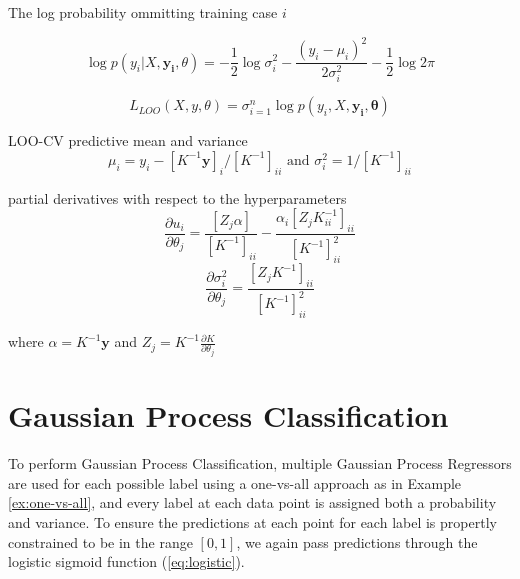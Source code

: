 The log probability ommitting training case $i$

$$\log p(y_i|X, \mathbf{y_i}, \theta) = -\frac{1}{2}\log\sigma^2_i - \frac{(y_i - \mu_i)^2}{2 \sigma^2_i} - \frac{1}{2}\log2\pi$$

$$ L_{LOO}(X, y, \theta) = \sigma^n_{i=1} \log p(y_i, X, \mathbf{y_i}, \mathbf{\theta})$$

LOO-CV predictive mean and variance
$$\mu_i= y_i - [K^{-1}\mathbf{y}]_i / [K^{-1}]_{ii} \text{ and } \sigma_i^2 = 1/[K^{-1}]_{ii}$$

partial derivatives with respect to the hyperparameters
$$\frac{\partial{u_i}}{\partial{\theta_j}} = \frac{[Z_j \alpha]}{[K^{-1}]_{ii}} - \frac{\alpha_i[Z_j K^{-1}_{ii}]_{ii}}{[K^{-1}]^2_{ii}}$$
$$\frac{\partial{\sigma_i^2}}{\partial{\theta_j}} = \frac{[Z_jK^{-1}]_{ii}}{[K^{-1}]^2_{ii}}$$

where $\alpha = K^{-1}\mathbf{y}$ and $Z_j = K^{-1} \frac{\partial{K}}{\partial{\theta_j}}$


\section{Gaussian Process Classification} \label{chapsec:gpc}

To perform Gaussian Process Classification, multiple Gaussian Process Regressors are used for each possible label using a one-vs-all approach as in Example \autoref{ex:one-vs-all}, and every label at each data point is assigned both a probability and variance. To ensure the predictions at each point for each label is propertly constrained to be in the range $[0,1]$, we again pass predictions through the logistic sigmoid function (\autoref{eq:logistic}).


% 

